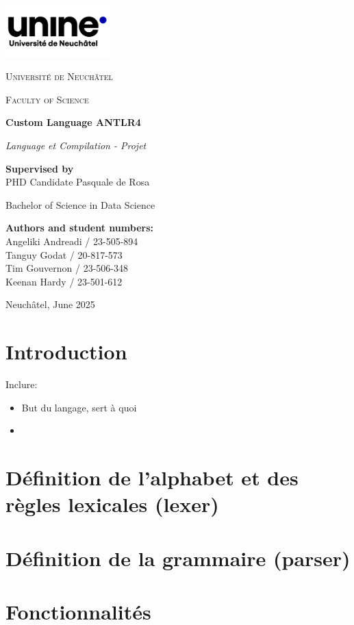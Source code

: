 \documentclass[12pt,a4paper]{article}
\begin{document}

\begin{titlepage}
    \centering
    \includegraphics[width=0.3\textwidth]{doc/logo.png}\vspace{0.5cm}

    {\scshape\LARGE Université de Neuchâtel \par}
    \vspace{1cm}
    {\scshape\Large Faculty of Science \par}
    \vspace{1.5cm}

    {\Huge\bfseries Custom Language ANTLR4 \par}

    {\Large\itshape Language et Compilation - Projet \par}
    \vspace{1cm}

            \textbf{Supervised by}\\
            PHD Candidate Pasquale de Rosa
    \vfill

    {\large Bachelor of Science in Data Science\par}
    \vspace{0.5cm}

    {\large \bfseries Authors and student numbers:}\\[0.2cm]
    Angeliki Andreadi / 23-505-894 \\
    Tanguy Godat / 20-817-573 \\
    Tim Gouvernon / 23-506-348 \\
    Keenan Hardy / 23-501-612 \\
    \vfill

    {\large Neuchâtel, June 2025\par}
\end{titlepage}

\newpage
\section{Introduction}
Inclure: 
\begin{itemize}
    \item But du langage, sert à quoi
    \item 
\end{itemize}
\section{Définition de l'alphabet et des règles lexicales (lexer)}
\section{Définition de la grammaire (parser)}
\section{Fonctionnalités}
\end{document}
